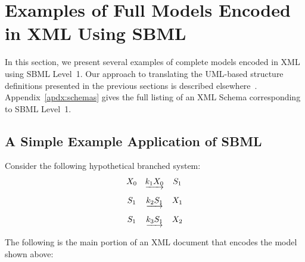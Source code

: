 \documentclass[10pt]{cekarticle}
\begin{document}
\section{Examples of Full Models Encoded in XML Using SBML}
\label{sec:xml-rep}

In this section, we present several examples of complete models encoded in
XML using SBML Level~1.  Our approach to translating the UML-based
structure definitions presented in the previous sections is described
elsewhere~\citep{hucka:2000b}.  Appendix~\ref{apdx:schemas} gives the full
listing of an XML Schema corresponding to SBML Level~1.


\subsection{A Simple Example Application of SBML}

Consider the following hypothetical branched system:
\begin{equation*}
  \begin{array}{@{}ccc@{}}
    X_0 & \underrightarrow{k_1 X_0} & S_1 \\ \\[-4pt]
    S_1 & \underrightarrow{k_2 S_1} & X_1 \\ \\[-4pt]
    S_1 & \underrightarrow{k_3 S_1} & X_2
  \end{array}
\end{equation*}

The following is the main portion of an XML document that encodes the model
shown above:
\end{document}
